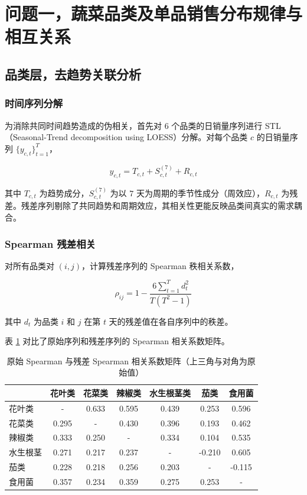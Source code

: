 \section{问题一，蔬菜品类及单品销售分布规律与相互关系}

\subsection{品类层，去趋势关联分析}

\subsubsection{时间序列分解}

为消除共同时间趋势造成的伪相关，首先对 6 个品类的日销量序列进行 STL（Seasonal-Trend decomposition using LOESS）分解。对每个品类 $c$ 的日销量序列 $\{y_{c,t}\}_{t=1}^{T}$，

\begin{equation}
y_{c,t} = T_{c,t} + S_{c,t}^{(7)} + R_{c,t}
\end{equation}

其中 $T_{c,t}$ 为趋势成分，$S_{c,t}^{(7)}$ 为以 $7$ 天为周期的季节性成分（周效应），$R_{c,t}$ 为残差。残差序列剔除了共同趋势和周期效应，其相关性更能反映品类间真实的需求耦合。

\subsubsection{Spearman 残差相关}

对所有品类对 $(i, j)$，计算残差序列的 Spearman 秩相关系数，

\begin{equation}
\rho_{ij} = 1 - \frac{6\sum_{t=1}^{T} d_{t}^2}{T(T^2-1)}
\end{equation}

其中 $d_t$ 为品类 $i$ 和 $j$ 在第 $t$ 天的残差值在各自序列中的秩差。

表 \ref{tab:q1_spearman} 对比了原始序列和残差序列的 Spearman 相关系数矩阵。

\begin{table}[H]
\centering
\caption{原始 Spearman 与残差 Spearman 相关系数矩阵（上三角与对角为原始值）}
\label{tab:q1_spearman}
\begin{tabular}{l|cccccc}
\hline
 & 花叶类 & 花菜类 & 辣椒类 & 水生根茎类 & 茄类 & 食用菌 \\
\hline
花叶类 & - & 0.633 & 0.595 & 0.439 & 0.253 & 0.596 \\
花菜类 & 0.295 & - & 0.430 & 0.396 & 0.193 & 0.462 \\
辣椒类 & 0.333 & 0.250 & - & 0.334 & 0.104 & 0.535 \\
水生根茎 & 0.271 & 0.217 & 0.237 & - & -0.210 & 0.605 \\
茄类 & 0.228 & 0.218 & 0.256 & 0.203 & - & -0.115 \\
食用菌 & 0.357 & 0.234 & 0.359 & 0.275 & 0.253 & - \\
\hline
\end{tabular}
\end{table}

